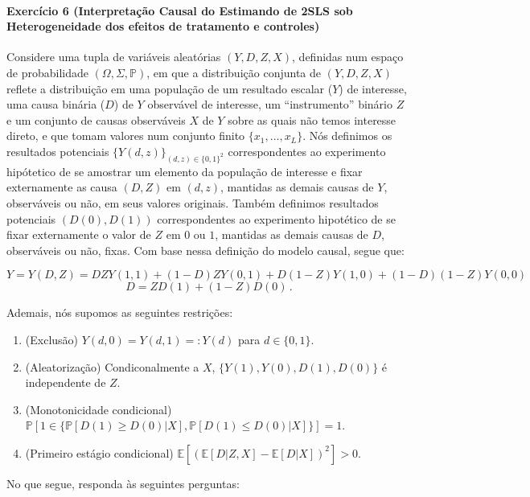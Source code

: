 \documentclass[10pt,a4paper]{article}
\begin{document}
\paragraph{Exercício 6 (Interpretação Causal do Estimando de 2SLS sob Heterogeneidade dos efeitos de tratamento e controles)} Considere uma tupla de variáveis aleatórias $(Y,D,Z,X)$, definidas num espaço de probabilidade  $(\Omega, \Sigma,\mathbb{P})$, em que a distribuição conjunta de $(Y,D,Z,X)$ reflete a distribuição em uma população de um resultado escalar ($Y$) de interesse, uma causa binária ($D$) de $Y$ observável de interesse, um ``instrumento'' binário $Z$ e um conjunto de causas observáveis $X$ de $Y$ sobre as quais não temos interesse direto, e que tomam valores num conjunto finito $\{x_1,\ldots, x_L\}$. Nós definimos os resultados potenciais $\{Y(d,z)\}_{(d,z)\in \{0,1\}^2}$ correspondentes ao experimento hipótetico de se amostrar um elemento da população de interesse e fixar externamente as causa $(D,Z)$ em $(d,z)$, mantidas as demais causas de $Y$, observáveis ou não, em seus valores originais. Também definimos resultados potenciais $(D(0),D(1))$ correspondentes ao experimento hipotético de se fixar externamente o valor de $Z$ em $0$ ou $1$, mantidas as demais causas de $D$, observáveis ou não, fixas.
Com base nessa definição do modelo causal, segue que: 

$$Y = Y(D,Z) = DZ Y(1,1) +(1-D)ZY(0,1) + D(1-Z)Y(1,0) +(1-D)(1-Z)Y(0,0)$$
$$D = ZD(1) + (1-Z)D(0)\, .$$

Ademais, nós supomos as seguintes restrições:

\begin{enumerate}
	\item (Exclusão) $Y(d,0) = Y(d,1) =: Y(d)$ para $d \in \{0,1\}$.
	\item (Aleatorização) Condiconalmente a $X$, $\{Y(1),Y(0),D(1),D(0)\}$ é independente de $Z$.
	\item (Monotonicidade condicional)  $\mathbb{P}[1 \in \{\mathbb{P}[D(1)\geq D(0)|X] ,\mathbb{P}[D(1)\leq D(0)|X]\}]=1$.
	\item (Primeiro estágio condicional)  $\mathbb{E}[(\mathbb{E}[D|Z,X]-\mathbb{E}[D|X])^2]>0$.
\end{enumerate}

\vspace{0.5em}

No que segue, responda às seguintes perguntas:
\end{document}
